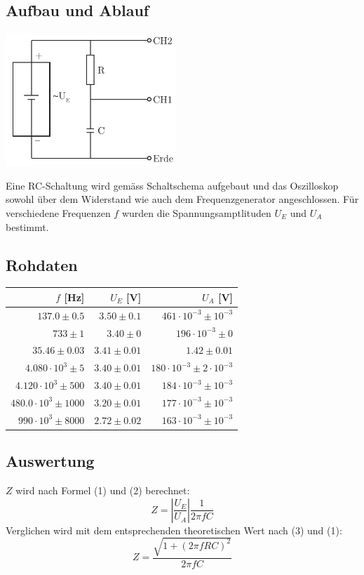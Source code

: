 \documentclass[12pt,a4paper]{article}
\begin{document}
\subsection*{Aufbau und Ablauf}
\includegraphics[height=5cm]{illustration3.pdf}

\noindent
Eine RC-Schaltung wird gem\"ass Schaltschema aufgebaut und das Oszilloskop sowohl \"uber dem Widerstand wie auch dem Frequenzgenerator angeschlossen. F\"ur verschiedene Frequenzen $f$ wurden die Spannungsamptlituden $U_E$ und $U_A$ bestimmt.

\subsection*{Rohdaten} 
\begin{tabular}{|r|r|r|}
\hline
$f$ [Hz]&$U_E$ [V]&$U_A$ [V]\\
\hline
$137.0 \pm 0.5$&$3.50 \pm 0.1$&$461\cdot 10^{-3} \pm 10^{-3}$\\
$733 \pm 1$&$3.40 \pm 0$&$196\cdot 10^{-3} \pm 0$\\
$35.46 \pm 0.03$&$3.41 \pm 0.01$&$1.42 \pm 0.01$\\
$4.080\cdot 10^{3} \pm 5$&$3.40 \pm 0.01$&$180\cdot 10^{-3} \pm 2\cdot 10^{-3}$\\
$4.120\cdot 10^{3} \pm 500$&$3.40 \pm 0.01$&$184\cdot 10^{-3} \pm 10^{-3}$\\
$480.0\cdot 10^{3} \pm 1000$&$3.20 \pm 0.01$&$177\cdot 10^{-3} \pm 10^{-3}$\\
$990\cdot 10^{3} \pm 8000$&$2.72 \pm 0.02$&$163\cdot 10^{-3} \pm 10^{-3}$\\
\hline
\end{tabular}

\subsection*{Auswertung}
$Z$ wird nach Formel (1) und (2) berechnet:
\[Z = \left| \frac{U_E}{U_A} \right| \frac{1}{2\pi f C} \]
Verglichen wird mit dem entsprechenden theoretischen Wert nach (3) und (1):
\[ Z =  \frac{\sqrt{1+(2\pi f R C)^2}}{2\pi f C} \]
\end{document}
